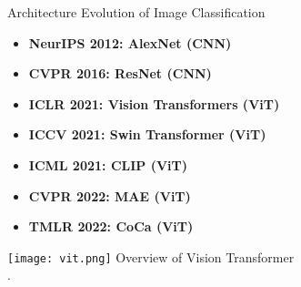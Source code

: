\begin{refsection}
  \begin{frame}{Architecture Evolution of Image Classification}
    \begin{minipage}{0.48\linewidth}
      {\tiny
      \begin{itemize}
        \item \textbf{NeurIPS 2012: AlexNet (CNN)} \\
        \parencite{krizhevskyImageNetClassificationDeep2012}
        \item \textbf{CVPR 2016: ResNet (CNN)} \\
        \parencite{heDeepResidualLearning2016}
        \item \textbf{ICLR 2021: Vision Transformers (ViT)} \\
        \parencite{dosovitskiyImageWorth16x162020}
        \item \textbf{ICCV 2021: Swin Transformer (ViT)} \\
        \parencite{liuSwinTransformerHierarchical2021}
        \item \textbf{ICML 2021: CLIP (ViT)} \\
        \parencite{radfordLearningTransferableVisual2021}
        \item \textbf{CVPR 2022: MAE (ViT)} \\
        \parencite{heMaskedAutoencodersAre2022}
        \item \textbf{TMLR 2022: CoCa (ViT)} \\
        \parencite{yuCoCaContrastiveCaptioners2022}
      \end{itemize}
      }
    \end{minipage}%
    \hfill
    \begin{minipage}{0.48\linewidth}
      \centering
      \texttt{[image: vit.png]}
      \scriptsize Overview of Vision Transformer\\\parencite{dosovitskiyImageWorth16x162020}.
    \end{minipage}
    \bottomleftrefs
  \end{frame}
\end{refsection}

